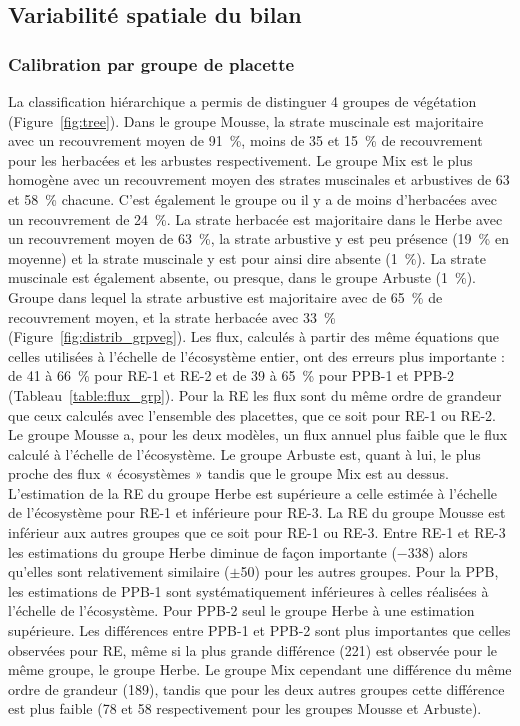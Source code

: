 \subsection{Variabilité spatiale du bilan}

\subsubsection{Calibration par groupe de placette}



La classification hiérarchique a permis de distinguer 4 groupes de végétation (Figure~\ref{fig:tree}).
Dans le groupe Mousse, la strate muscinale est majoritaire avec un recouvrement moyen de \SI{91}{\percent}, moins de \num{35} et \SI{15}{\percent} de recouvrement pour les herbacées et les arbustes respectivement.
Le groupe Mix est le plus homogène avec un recouvrement moyen des strates muscinales et arbustives de \num{63} et \SI{58}{\percent} chacune.
C'est également le groupe ou il y a de moins d'herbacées avec un recouvrement de \SI{24}{\percent}.
La strate herbacée est majoritaire dans le Herbe avec un recouvrement moyen de \SI{63}{\percent}, la strate arbustive y est peu présence (\SI{19}{\percent} en moyenne) et la strate muscinale y est pour ainsi dire absente (\SI{1}{\percent}).
La strate muscinale est également absente, ou presque, dans le groupe Arbuste (\SI{1}{\percent}).
Groupe dans lequel la strate arbustive est majoritaire avec de \SI{65}{\percent} de recouvrement moyen, et la strate herbacée avec \SI{33}{\percent} (Figure~\ref{fig:distrib_grpveg}).
Les flux, calculés à partir des même équations que celles utilisées à l'échelle de l'écosystème entier, ont des erreurs plus importante : de \num{41} à \SI{66}{\percent} pour RE-1 et RE-2 et de \num{39} à \SI{65}{\percent} pour PPB-1 et PPB-2 (Tableau~\ref{table:flux_grp}).
Pour la RE les flux sont du même ordre de grandeur que ceux calculés avec l'ensemble des placettes, que ce soit pour RE-1 ou RE-2.
Le groupe Mousse a, pour les deux modèles, un flux annuel plus faible que le flux calculé à l'échelle de l'écosystème.
Le groupe Arbuste est, quant à lui, le plus proche des flux « écosystèmes » tandis que le groupe Mix est au dessus.
L'estimation de la RE du groupe Herbe est supérieure a celle estimée à l'échelle de l'écosystème pour RE-1 et inférieure pour RE-3.
La RE du groupe Mousse est inférieur aux autres groupes que ce soit pour RE-1 ou RE-3. 
Entre RE-1 et RE-3 les estimations du groupe Herbe diminue de façon importante (\num{-338}) alors qu'elles sont relativement similaire ($\pm$\num{50}) pour les autres groupes.
Pour la PPB, les estimations de PPB-1 sont systématiquement inférieures à celles réalisées à l'échelle de l'écosystème.
Pour PPB-2 seul le groupe Herbe à une estimation supérieure.
Les différences entre PPB-1 et PPB-2 sont plus importantes que celles observées pour RE, même si la plus grande différence (\num{221}) est observée pour le même groupe, le groupe Herbe.
Le groupe Mix cependant une différence du même ordre de grandeur (\num{189}), tandis que pour les deux autres groupes cette différence est plus faible (78 et 58 respectivement pour les groupes Mousse et Arbuste).

